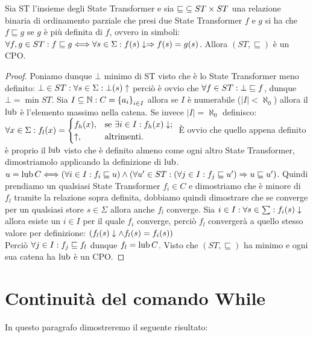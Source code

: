 \begin{proposizione} 
Sia ST l'insieme degli State Transformer e sia $\mathord{\sqsubseteq}\subseteq ST\times ST$ una relazione binaria di ordinamento parziale che presi due State Transformer $f$ e $g$ si ha che $f \sqsubseteq g$ se $g$ è più definita di $f$, ovvero in simboli: $\forall f,g \in ST \mathrel{:} f \sqsubseteq g \Longleftrightarrow \forall s \in \Sigma \mathrel{:} f(s)\downarrow \Rightarrow f(s) = g(s)$. Allora $(ST, \sqsubseteq)$ è un CPO.
\end{proposizione}
\begin{proof}
Poniamo dunque $\bot$ minimo di ST visto che è lo State Transformer meno definito: $\bot \in ST \mathrel{:} \forall s \in \Sigma \mathrel{:} \bot(s)\uparrow$ perciò è ovvio che $\forall f \in ST \mathrel{:} \bot \sqsubseteq f$, dunque $\bot = \min ST$. 
Sia $I \subseteq \mathbb{N} \mathrel{:} C = \left\{a_i\right\}_{i \in I}$ allora se $I$ è numerabile ($|I| < \aleph_0$) allora il $\mathop{\mathrm{lub}}\nolimits$ è l'elemento massimo nella catena. Se invece $|I| = \aleph_0$ definisco:
        $\forall x \in \Sigma \mathrel{:} f_l(x) =
    \begin{cases}
      f_h(x), &\text{se $\exists i \in I \mathrel{:} f_h(x)\downarrow$;}\\
      \uparrow, &\text{altrimenti.}
    \end{cases}\\ $
È ovvio che quello appena definito è proprio il $\mathop{\mathrm{lub}}\nolimits$ visto che è definito almeno come ogni altro State Transformer, dimostriamolo applicando la definizione di $\mathop{\mathrm{lub}}\nolimits$.
$u = \mathop{\mathrm{lub}}\nolimits C \Longleftrightarrow (\forall i \in I \mathrel{:} f_i \sqsubseteq u) \land (\forall u' \in ST \mathrel{:} (\forall j \in I \mathrel{:} f_j \sqsubseteq u') \Rightarrow u \sqsubseteq u')$.
Quindi prendiamo un qualsiasi State Transformer $f_i \in C$ e dimostriamo che è minore di $f_l$ tramite la relazione sopra definita, dobbiamo quindi dimostrare che se converge per un qualsiasi store $s \in \Sigma$ allora anche $f_l$ converge. Sia $i \in I \mathrel{:} \forall s \in \sum \mathrel{:} f_i(s)\downarrow$ allora esiste un $i \in I$ per il quale $f_i$ converge, perciò $f_l$ convergerà a quello stesso valore per definizione: $(f_l(s)\downarrow \land f_l(s)=f_i(s))$\\
Perciò $\forall j \in I \mathrel{:} f_j \sqsubseteq f_l$ dunque  $f_l = \mathop{\mathrm{lub}}\nolimits C$. Visto che $(ST, \sqsubseteq)$ ha minimo e ogni sua catena ha $\mathop{\mathrm{lub}}\nolimits$ è un CPO.
\end{proof}

\section{Continuità del comando While}
In questo paragrafo dimostreremo il seguente risultato:

